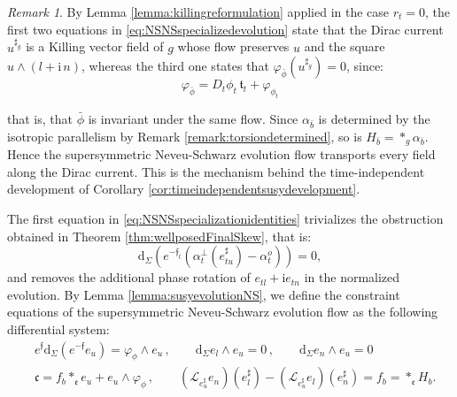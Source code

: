\documentclass[10pt,reqno,a4paper]{amsart}
\theoremstyle{plain}
\theoremstyle{definition}
\theoremstyle{remark}
\newtheorem{remark}[thm]{Remark}
\theoremstyle{remark}
\def\dd{\mathrm{d}}
\def\cL{\mathcal{L}}
\def\frc{\mathfrak{c}}
\def\cL{\mathcal{L}}
\def\fre{\mathfrak{e}}
\renewcommand{\(}{ (}
\renewcommand{\)}{ )}
\newcommand{\frf}{\mathfrak{f}}
\begin{document}
\begin{remark}
\label{remark:NSevolutionisgauge}
By Lemma \ref{lemma:killingreformulation} applied in the case $r_t = 0$, the first two equations in \eqref{eq:NSNSspecializedevolution} state that the Dirac current $u^{\sharp_g}$ is a Killing vector field of $g$ whose flow preserves $u$ and the square $u\wedge(l + \mathrm{i}\, n)$, whereas the third one states that $\varphi_{\bar{\phi}}(u^{\sharp_g}) = 0$, since:
\begin{equation*}
\varphi_{\bar{\phi}} =  D_t\phi_t\, \mathfrak{t}_t + \varphi_{\phi_t}    
\end{equation*}

\noindent
that is, that $\bar{\phi}$ is invariant under the same flow. Since $\alpha_{\bar{b}}$ is determined by the isotropic parallelism by Remark \ref{remark:torsiondetermined}, so is $H_{\bar{b}} = \ast_g\alpha_{\bar{b}}$. Hence the supersymmetric Neveu-Schwarz evolution flow transports every field along the Dirac current. This is the mechanism behind the time-independent development of Corollary \ref{cor:timeindependentsusydevelopment}.
\end{remark}

\noindent
The first equation in \eqref{eq:NSNSspecializationidentities} trivializes the obstruction obtained in Theorem \ref{thm:wellposedFinalSkew}, that is:
\begin{equation*} 
 \dd_\Sigma (e^{-\frf_t}
 (\alpha_t^\perp(e^{\sharp}_{tu})-\alpha_t^o) )=0,
\end{equation*}
and removes the additional phase rotation of $e_{tl}+\mathrm{i}e_{tn}$ in the normalized evolution. By Lemma \ref{lemma:susyevolutionNS}, we define the constraint equations of the supersymmetric Neveu-Schwarz evolution flow as the following differential system:
\begin{eqnarray}
 \label{eq:NSNSsusyconstraintsI}
 & e^{\frf} \dd_\Sigma(e^{-\frf}e_{u}) = \varphi_{\phi}\wedge e_{u}\, , \qquad   \dd_\Sigma e_{l}\wedge e_{u} = 0\, ,
 \qquad \dd_\Sigma e_{n}\wedge e_{u}=0 \\ 
& \frc = f_{b}\ast_{\fre} e_{u} + e_{u}\wedge\varphi_{\phi}\, , \qquad (\cL_{e^{\sharp}_{u}}e_{n})(e^{\sharp}_{l}) -(\cL_{e^{\sharp}_{u}}e_{l})(e^{\sharp}_{n}) = f_{b} = \ast_{\fre}H_b.  \label{eq:NSNSsusyconstraintsII}
\end{eqnarray}
\end{document}
